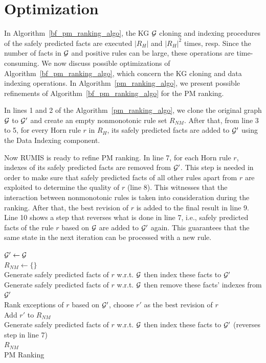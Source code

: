\section{Optimization}

In Algorithm~\ref{bf_pm_ranking_algo}, the KG $\mathcal{G}$ cloning and indexing procedures of the safely predicted facts are executed $|R_H|$ and $|R_H|^2$ times, resp. Since the number of facts in $\mathcal{G}$ and positive rules can be large, these operations are time-consuming. We now discuss possible optimizations of Algorithm~\ref{bf_pm_ranking_algo}, which concern the KG cloning and data indexing operations. In Algorithm~\ref{pm_ranking_algo}, we present possible refinements of Algorithm~\ref{bf_pm_ranking_algo} for the PM ranking.

In lines 1 and 2 of the Algorithm~\ref{pm_ranking_algo}, we clone the original graph $\mathcal{G}$ to $\mathcal{G}'$ and create an empty nonmonotonic rule set $R_{NM}$. After that, from line 3 to 5, for every Horn rule $r$ in $R_H$, its safely predicted facts are added to $\mathcal{G}'$ using the Data Indexing component.

Now RUMIS is ready to refine PM ranking. In line 7, for each Horn rule $r$, indexes of its safely predicted facts are removed from $\mathcal{G}'$. This step is needed in order to make sure that safely predicted facts of all other rules apart from $r$ are exploited to determine the quality of $r$ (line 8). This witnesses that the interaction between nonmonotonic rules is taken into consideration during the ranking. After that, the best revision of $r$ is added to the final result in line 9. Line 10 shows a step that reverses what is done in line 7, i.e., safely predicted facts of the rule $r$ based on $\mathcal{G}$ are added to $\mathcal{G}'$ again. This guarantees that the same state in the next iteration can be processed with a new rule.

\IncMargin{1.5em}
\begin{algorithm}[H]
\DontPrintSemicolon
\SetAlgoLined
{}
\BlankLine
$\mathcal{G}' \leftarrow \mathcal{G}$\\
$R_{NM} \leftarrow \{\}$\\
\BlankLine
{} {
	Generate safely predicted facts of $r$ w.r.t. $\mathcal{G}$ then index these facts to $\mathcal{G}'$\\
}
\BlankLine
{} {
	Generate safely predicted facts of $r$ w.r.t. $\mathcal{G}$ then remove these facts' indexes from $\mathcal{G}'$\\
	Rank exceptions of $r$ based on $\mathcal{G}'$, choose $r'$ as the best revision of $r$\\
	Add $r'$ to $R_{NM}$\\
	Generate safely predicted facts of $r$ w.r.t. $\mathcal{G}$ then index these facts to $\mathcal{G}'$ (reverses step in line 7)\\
}
\Return $R_{NM}$\\
\caption{PM Ranking}
\label{pm_ranking_algo}
\end{algorithm}
\DecMargin{1.5em}


